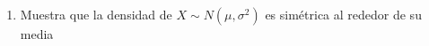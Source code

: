 \documentclass{report}
\begin{document}
\begin{enumerate}




    \item Muestra que la densidad de $X\sim N(\mu,\sigma^2)$ es simétrica al rededor de su media


\end{enumerate}
\end{document}
